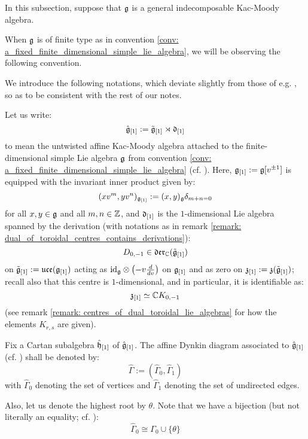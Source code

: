         \begin{convention}
            In this subsection, suppose that $\mathfrak{g}$ is a general indecomposable Kac-Moody algebra. 
        \end{convention}
        When $\mathfrak{g}$ is of finite type as in convention \ref{conv: a_fixed_finite_dimensional_simple_lie_algebra}, we will be observing the following convention.
        \begin{convention} \label{conv: a_fixed_untwisted_affine_kac_moody_algebra}
            We introduce the following notations, which deviate slightly from those of e.g. \cite[Chapter 7]{kac_infinite_dimensional_lie_algebras}, so as to be consistent with the rest of our notes.
        
            Let us write:
                $$\hat{\mathfrak{g}}_{[1]} := \tilde{\mathfrak{g}}_{[1]} \rtimes \mathfrak{d}_{[1]}$$
            to mean the untwisted affine Kac-Moody algebra attached to the finite-dimensional simple Lie algebra $\mathfrak{g}$ from convention \ref{conv: a_fixed_finite_dimensional_simple_lie_algebra} (cf. \cite[Chapter 7]{kac_infinite_dimensional_lie_algebras}). Here, $\mathfrak{g}_{[1]} := \mathfrak{g}[v^{\pm 1}]$ is equipped with the invariant inner product given by:
                $$(x v^m, y v^n)_{\mathfrak{g}_{[1]}} := (x, y)_{\mathfrak{g}} \delta_{m + n = 0}$$
            for all $x, y \in \mathfrak{g}$ and all $m, n \in \mathbb{Z}$, and $\mathfrak{d}_{[1]}$ is the $1$-dimensional Lie algebra spanned by the derivation (with notations as in remark \ref{remark: dual_of_toroidal_centres_contains_derivations}):
                $$D_{0, -1} \in \mathfrak{der}_{\mathbb{C}}(\tilde{\mathfrak{g}}_{[1]})$$
            on $\tilde{\mathfrak{g}}_{[1]} := \mathfrak{uce}(\mathfrak{g}_{[1]})$ acting as $\id_{\g} \tensor \left( -v \frac{d}{dv} \right)$ on $\mathfrak{g}_{[1]}$ and as zero on $\mathfrak{z}_{[1]} := \mathfrak{z}(\tilde{\mathfrak{g}}_{[1]})$; recall also that this centre is $1$-dimensional, and in particular, it is identifiable as:
                $$\mathfrak{z}_{[1]} \simeq \mathbb{C} K_{0, -1}$$
            (see remark \ref{remark: centres_of_dual_toroidal_lie_algebras} for how the elements $K_{r, s}$ are given).

            Fix a Cartan subalgebra $\hat{\mathfrak{h}}_{[1]}$ of $\hat{\mathfrak{g}}_{[1]}$. The affine Dynkin diagram associated to $\hat{\mathfrak{g}}_{[1]}$ (cf. \cite[Chapter 4]{kac_infinite_dimensional_lie_algebras}) shall be denoted by:
                $$\hat{\Gamma} := ( \hat{\Gamma}_0, \hat{\Gamma}_1 )$$
            with $\hat{\Gamma}_0$ denoting the set of vertices and $\hat{\Gamma}_1$ denoting the set of undirected edges.

            Also, let us denote the highest root by $\theta$. Note that we have a bijection (but not literally an equality; cf. \cite[Chapters 4, 5, 7]{kac_infinite_dimensional_lie_algebras}):
                $$\hat{\Gamma}_0 \cong \Gamma_0 \cup \{\theta\}$$
        \end{convention}
